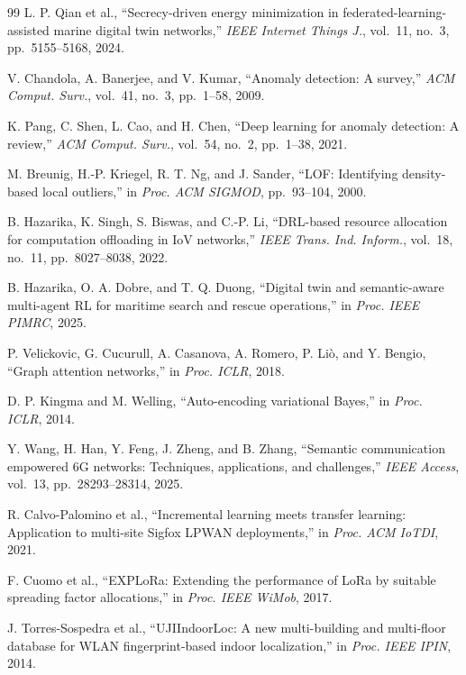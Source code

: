 \documentclass[conference]{IEEEtran}
\begin{document}
\begin{thebibliography}{99}
L. P. Qian et al.,
``Secrecy-driven energy minimization in federated-learning-assisted
marine digital twin networks,''
\textit{IEEE Internet Things J.}, vol.~11, no.~3, pp.~5155--5168, 2024.

V. Chandola, A. Banerjee, and V. Kumar,
``Anomaly detection: A survey,''
\textit{ACM Comput. Surv.}, vol.~41, no.~3, pp.~1--58, 2009.

K. Pang, C. Shen, L. Cao, and H. Chen,
``Deep learning for anomaly detection: A review,''
\textit{ACM Comput. Surv.}, vol.~54, no.~2, pp.~1--38, 2021.

M. Breunig, H.-P. Kriegel, R. T. Ng, and J. Sander,
``LOF: Identifying density-based local outliers,''
in \textit{Proc. ACM SIGMOD}, pp.~93--104, 2000.

B. Hazarika, K. Singh, S. Biswas, and C.-P. Li,
``DRL-based resource allocation for computation offloading in IoV
networks,''
\textit{IEEE Trans. Ind. Inform.}, vol.~18, no.~11,
pp.~8027--8038, 2022.

B. Hazarika, O. A. Dobre, and T. Q. Duong,
``Digital twin and semantic-aware multi-agent RL for maritime search
and rescue operations,''
in \textit{Proc. IEEE PIMRC}, 2025.

P. Velickovic, G. Cucurull, A. Casanova, A. Romero, P. Liò,
and Y. Bengio,
``Graph attention networks,''
in \textit{Proc. ICLR}, 2018.

D. P. Kingma and M. Welling,
``Auto-encoding variational Bayes,''
in \textit{Proc. ICLR}, 2014.

Y. Wang, H. Han, Y. Feng, J. Zheng, and B. Zhang,
``Semantic communication empowered 6G networks: Techniques,
applications, and challenges,''
\textit{IEEE Access}, vol.~13, pp.~28293--28314, 2025.

R. Calvo-Palomino et al.,
``Incremental learning meets transfer learning: Application to
multi-site Sigfox LPWAN deployments,''
in \textit{Proc. ACM IoTDI}, 2021.

F. Cuomo et al.,
``EXPLoRa: Extending the performance of LoRa by suitable spreading
factor allocations,''
in \textit{Proc. IEEE WiMob}, 2017.

J. Torres-Sospedra et al.,
``UJIIndoorLoc: A new multi-building and multi-floor database for WLAN
fingerprint-based indoor localization,''
in \textit{Proc. IEEE IPIN}, 2014.

\end{thebibliography}
\end{document}
